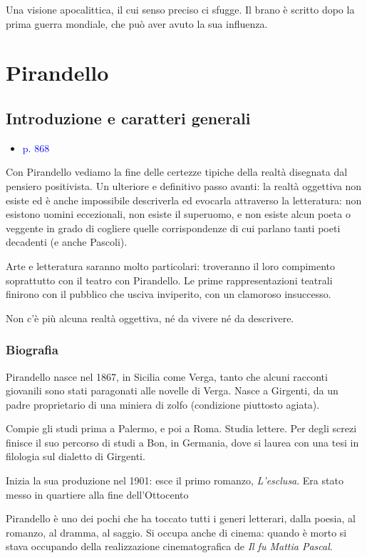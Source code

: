 \documentclass[a4paper, twoside, titlepage]{book}
\newcommand{\elenco}[1]{%
\begin{itemize}
#1
\end{itemize}}
\renewcommand{\emph}[1]{\textcolor{blue}{#1}}
\begin{document}
Una visione apocalittica, il cui senso preciso ci sfugge. Il brano è scritto dopo la prima guerra mondiale, che può aver avuto la sua influenza.

\part{Pirandello}

\chapter{Introduzione e caratteri generali}

\elenco{\item \emph{p. 868}}

Con Pirandello vediamo la fine delle certezze tipiche della realtà disegnata dal pensiero positivista.
Un ulteriore e definitivo passo avanti: la realtà oggettiva non esiste ed è anche impossibile descriverla ed evocarla attraverso la letteratura: non esistono uomini eccezionali, non esiste il superuomo, e non esiste alcun poeta o veggente in grado di cogliere quelle corrispondenze di cui parlano tanti poeti decadenti (e anche Pascoli).

Arte e letteratura saranno molto particolari: troveranno il loro compimento soprattutto con il teatro con Pirandello. Le prime rappresentazioni teatrali finirono con il pubblico che usciva inviperito, con un clamoroso insuccesso.

Non c'è più alcuna realtà oggettiva, né da vivere né da descrivere.

\section{Biografia}

Pirandello nasce nel 1867, in Sicilia come Verga, tanto che alcuni racconti giovanili sono stati paragonati alle novelle di Verga.
Nasce a Girgenti, da un padre proprietario di una miniera di zolfo (condizione piuttosto agiata).

Compie gli studi prima a Palermo, e poi a Roma. Studia lettere.
Per degli screzi finisce il suo percorso di studi a Bon, in Germania, dove si laurea con una tesi in filologia sul dialetto di Girgenti.

Inizia la sua produzione nel 1901: esce il primo romanzo, \textit{L'esclusa}. Era stato messo in quartiere alla fine dell'Ottocento

Pirandello è uno dei pochi che ha toccato tutti i generi letterari, dalla poesia, al romanzo, al dramma, al saggio. Si occupa anche di cinema: quando è morto si stava occupando della realizzazione cinematografica de \textit{Il fu Mattia Pascal}.
\end{document}
